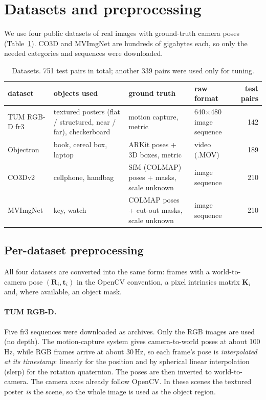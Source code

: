 \documentclass[11pt,a4paper]{article}
\newcommand{\R}{\mathbf{R}}
\newcommand{\tv}{\mathbf{t}}
\newcommand{\K}{\mathbf{K}}
\begin{document}
\section{Datasets and preprocessing}
\label{sec:data}

We use four public datasets of real images with ground-truth camera poses
(Table~\ref{tab:datasets}). CO3D and MVImgNet are hundreds of gigabytes each, so only the
needed categories and sequences were downloaded.

\begin{table}[H]
\centering
\small
\setlength{\tabcolsep}{4pt}\begin{tabularx}{\linewidth}{>{\raggedright}p{2.3cm} >{\raggedright}p{3.0cm} X >{\raggedright}p{2.1cm} r}
\toprule
dataset & objects used & ground truth & raw format & test pairs \\
\midrule
TUM RGB-D fr3 \cite{tum} & textured posters (flat / structured, near / far), checkerboard & motion capture, metric & 640$\times$480 image sequence & 142 \\
Objectron \cite{objectron} & book, cereal box, laptop & ARKit poses + 3D boxes, metric & video (.MOV) & 189 \\
CO3Dv2 \cite{co3d} & cellphone, handbag & SfM (COLMAP) poses + masks, scale unknown & image sequence & 210 \\
MVImgNet \cite{mvimgnet} & key, watch & COLMAP poses + cut-out masks, scale unknown & image sequence & 210 \\
\bottomrule
\end{tabularx}
\caption{Datasets. 751 test pairs in total; another 339 pairs were used only for tuning.}
\label{tab:datasets}
\end{table}

\subsection{Per-dataset preprocessing}

All four datasets are converted into the same form: frames with a world-to-camera pose
$(\R_i,\tv_i)$ in the OpenCV convention, a pixel intrinsics matrix $\K_i$ and, where
available, an object mask.

\paragraph{TUM RGB-D.} Five fr3 sequences were downloaded as archives. Only the RGB images
are used (no depth). The motion-capture system gives camera-to-world poses at about 100\,Hz,
while RGB frames arrive at about 30\,Hz, so each frame's pose is \emph{interpolated at its
timestamp}: linearly for the position and by spherical linear interpolation (slerp) for the
rotation quaternion. The poses are then inverted to world-to-camera. The camera axes already
follow OpenCV. In these scenes the textured poster \emph{is} the scene, so the whole image is
used as the object region.
\end{document}
